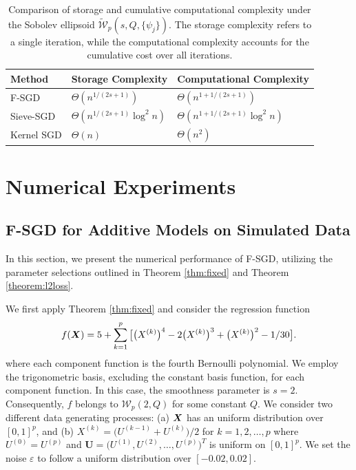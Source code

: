\begin{table}[ht]
\centering
\renewcommand{\arraystretch}{1.2}
\begin{tabular}{p{4.2cm}p{4.2cm}p{4.2cm}}
\toprule
Method & Storage Complexity & Computational Complexity \\
\midrule
F-SGD & $\Theta(n^{1/(2s+1)})$ & $\Theta(n^{1+1/(2s+1)})$ \\
Sieve-SGD \citep{zhang2022sieve} & $\Theta(n^{1/(2s+1)}\log^2 n)$ & $\Theta(n^{1+1/(2s+1)}\log^2 n)$ \\
Kernel SGD \citep{4406a3ce-1e59-3ed8-8c25-9f7d75b81f14,6842642} & $\Theta(n)$ & $\Theta(n^2)$  \\
\bottomrule
\end{tabular}
\caption{\small Comparison of storage and cumulative computational complexity under the Sobolev ellipsoid $ \tilde{\mathcal{W}}_p(s, Q, \{\psi_j\}) $. The storage complexity refers to a single iteration, while the computational complexity accounts for the cumulative cost over all iterations.} \label{table1}
\end{table}

\section{Numerical Experiments}\label{sec:numerical}

\subsection{F-SGD for Additive Models on Simulated Data}
In this section, we present the numerical performance of F-SGD, utilizing the parameter selections outlined in Theorem \ref{thm:fixed} and Theorem \ref{theorem:l2loss}.

We first apply Theorem \ref{thm:fixed} and  consider the regression function
\begin{align}\label{sim}
f(\bm{X}) = 5 + \sum_{k=1}^p\big[ \big(X^{(k)}\big)^4 - 2\big(X^{(k)}\big)^3 + \big(X^{(k)}\big)^2 - 1/30\big].
\end{align}
where each component function is the fourth Bernoulli polynomial. We employ the trigonometric basis, excluding the constant basis function, for each component function.  In this case, the smoothness parameter is $s = 2$. Consequently, $f$ belongs to $\mathcal{W}_p(2, Q)$ for some constant $Q$. We consider two different data generating processes: (a) $\bm{X}$ has an uniform distribution over $[0,1]^p$, and (b) $X^{(k)} = \big(U^{(k-1)}+U^{(k)}\big)/2$ for $k = 1,2,\dots,p$ where $U^{(0)}=U^{(p)}$ and $\boldsymbol{U} = \big(U^{(1)},U^{(2)},\dots,U^{(p)} \big)^T$ is uniform on $[0,1]^p$. We set the noise $\varepsilon$ to follow a uniform distribution over $[-0.02, 0.02]$.

